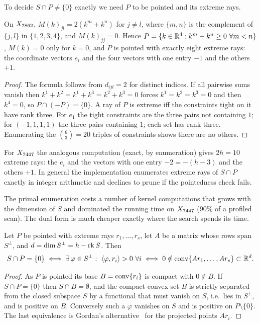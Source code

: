 To decide $S\cap P\neq\{0\}$ exactly we need $P$ to be pointed and its extreme
rays.

\begin{lemma}\label{lem:rays}
On $X_{7862}$, $M(k)_{jl}=2(k^m+k^n)$ for $j\ne l$, where $\{m,n\}$ is the
complement of $\{j,l\}$ in $\{1,2,3,4\}$, and $M(k)_{jj}=0$. Hence
$P=\{k\in\mathbb{R}^4:k^m+k^n\ge0\ \forall m<n\}$, $M(k)=0$ only for $k=0$, and $P$ is
pointed with exactly eight extreme rays: the coordinate vectors $e_i$ and the
four vectors with one entry $-1$ and the others $+1$.
\end{lemma}
\begin{proof}
The formula follows from $d_{ijl}=2$ for distinct indices. If all pairwise
sums vanish then $k^1+k^2=k^1+k^3=k^2+k^3=0$ forces $k^1=k^2=k^3=0$ and then
$k^4=0$, so $P\cap(-P)=\{0\}$. A ray of $P$ is extreme iff the constraints tight
on it have rank three. For $e_1$ the tight constraints are the three pairs not
containing $1$; for $(-1,1,1,1)$ the three pairs containing $1$; each set has
rank three. Enumerating the $\binom63=20$ triples of constraints shows there are
no others.
\end{proof}

For $X_{7447}$ the analogous computation (exact, by enumeration) gives $2h=10$
extreme rays: the $e_i$ and the vectors with one entry $-2=-(h-3)$ and the
others $+1$. In general the implementation enumerates extreme rays of $S\cap P$
exactly in integer arithmetic and declines to prune if the pointedness check
fails.

The primal enumeration costs a number of kernel computations that grows with
the dimension of $S$ and dominated the running time on $X_{7447}$ (90\% of a profiled
scan). The dual form is much cheaper exactly where the search spends its time.

\begin{proposition}\label{prop:dual}
Let $P$ be pointed with extreme rays $r_1,\dots,r_s$, let $A$ be a matrix whose
rows span $S^\perp$, and $d=\dim S^\perp=h-\operatorname{rk} S$. Then
\[
S\cap P=\{0\}\iff\exists\,\varphi\in S^\perp:\ \langle\varphi,r_i\rangle>0\ \forall i
\iff 0\notin\operatorname{conv}\{Ar_1,\dots,Ar_s\}\subset\mathbb{R}^d .
\]
\end{proposition}
\begin{proof}
As $P$ is pointed its base $B=\operatorname{conv}\{r_i\}$ is compact with $0\notin B$. If
$S\cap P=\{0\}$ then $S\cap B=\emptyset$, and the compact convex set $B$ is
strictly separated from the closed subspace $S$ by a functional that must vanish
on $S$, i.e.\ lies in $S^\perp$, and is positive on $B$. Conversely such a
$\varphi$ vanishes on $S$ and is positive on $P\setminus\{0\}$. The last
equivalence is Gordan's alternative~\cite{Schrijver1986} for the projected
points $Ar_i$.
\end{proof}

